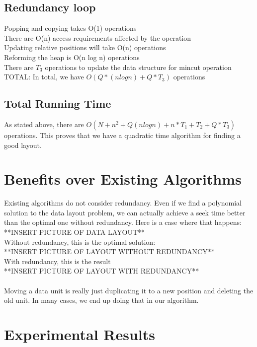 \documentclass[11pt,psfig]{article}
\begin{document}
\subsection*{Redundancy loop}
	Popping and copying takes O(1) operations\\
	There are O(n) access requirements affected by the operation\\
		Updating relative positions will take O(n) operations\\
	Reforming the heap is O(n log n) operations\\
	There are $T_3$ operations to update the data structure for mincut operation\\
	TOTAL: In total, we have $O(Q*(n log n) + Q*T_3)$ operations\\

\subsection*{Total Running Time}
	As stated above, there are $O(N + n^2 + Q(n logn) + n*T_1 + T_2 + Q*T_3 )$ operations. This proves that we have a quadratic time algorithm for finding a good layout.\\

\section*{Benefits over Existing Algorithms}

Existing algorithms do not consider redundancy. Even if we find a polynomial solution to the data layout problem, we can actually achieve a seek time better than the optimal one without redundancy. Here is a case where that happens:\\
**INSERT PICTURE OF DATA LAYOUT**\\
Without redundancy, this is the optimal solution:\\
**INSERT PICTURE OF LAYOUT WITHOUT REDUNDANCY**\\
With redundancy, this is the result\\
**INSERT PICTURE OF LAYOUT WITH REDUNDANCY**\\
\\
Moving a data unit is really just duplicating it to a new position and deleting the old unit. In many cases, we end up doing that in our algorithm. 
\section*{Experimental Results}
\end{document}
